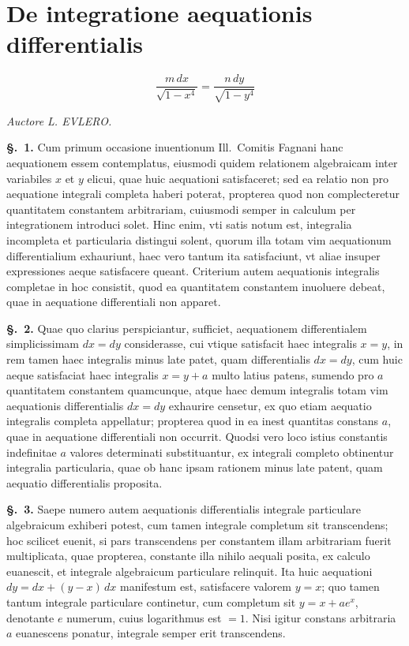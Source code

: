 \documentclass{article}
\begin{document}
\section*{De integratione aequationis differentialis}

\[ \frac{m\,dx}{\sqrt{1-x^{4}}} = \frac{n\,dy}{\sqrt{1-y^{4}}} \]

\emph{Auctore L. EVLERO.}

\textbf{§.~1.} Cum primum occasione inuentionum Ill.~Comitis Fagnani hanc aequationem essem
contemplatus, eiusmodi quidem relationem algebraicam inter variabiles $x$ et $y$ elicui, quae huic
aequationi satisfaceret; sed ea relatio non pro aequatione integrali completa haberi poterat,
propterea quod non complecteretur quantitatem constantem arbitrariam, cuiusmodi semper in calculum
per integrationem introduci solet. Hinc enim, vti satis notum est, integralia incompleta et
particularia distingui solent, quorum illa totam vim aequationum differentialium exhauriunt, haec
vero tantum ita satisfaciunt, vt aliae insuper expressiones aeque satisfacere queant. Criterium
autem aequationis integralis completae in hoc consistit, quod ea quantitatem constantem inuoluere
debeat, quae in aequatione differentiali non apparet.

\textbf{§.~2.} Quae quo clarius perspiciantur, sufficiet, aequationem differentialem
simplicissimam $dx = dy$ considerasse, cui vtique satisfacit haec integralis $x = y$, in rem tamen
haec integralis minus late patet, quam differentialis $dx = dy$, cum huic aeque satisfaciat haec
integralis $x = y + a$ multo latius patens, sumendo pro $a$ quantitatem constantem quamcunque,
atque haec demum integralis totam vim aequationis differentialis $dx = dy$ exhaurire censetur, ex
quo etiam aequatio integralis completa appellatur; propterea quod in ea inest quantitas constans
$a$, quae in aequatione differentiali non occurrit. Quodsi vero loco istius constantis indefinitae
$a$ valores determinati substituantur, ex integrali completo obtinentur integralia particularia,
quae ob hanc ipsam rationem minus late patent, quam aequatio differentialis proposita.

\textbf{§.~3.} Saepe numero autem aequationis differentialis integrale particulare algebraicum
exhiberi potest, cum tamen integrale completum sit transcendens; hoc scilicet euenit, si pars
transcendens per constantem illam arbitrariam fuerit multiplicata, quae propterea, constante illa
nihilo aequali posita, ex calculo euanescit, et integrale algebraicum particulare relinquit. Ita
huic aequationi $dy = dx + (y-x)\,dx$ manifestum est, satisfacere valorem $y = x$; quo tamen tantum
integrale particulare continetur, cum completum sit $y = x + ae^{x}$, denotante $e$ numerum, cuius
logarithmus est $=1$. Nisi igitur constans arbitraria $a$ euanescens ponatur, integrale semper erit
transcendens.
\end{document}
